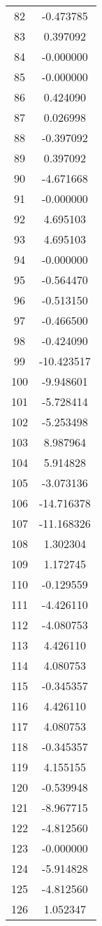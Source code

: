 \documentclass[12pt]{article}
\begin{document}
\begin{longtable}{@{}cc@{}}
82 & -0.473785 \\
83 & 0.397092 \\
84 & -0.000000 \\
85 & -0.000000 \\
86 & 0.424090 \\
87 & 0.026998 \\
88 & -0.397092 \\
89 & 0.397092 \\
90 & -4.671668 \\
91 & -0.000000 \\
92 & 4.695103 \\
93 & 4.695103 \\
94 & -0.000000 \\
95 & -0.564470 \\
96 & -0.513150 \\
97 & -0.466500 \\
98 & -0.424090 \\
99 & -10.423517 \\
100 & -9.948601 \\
101 & -5.728414 \\
102 & -5.253498 \\
103 & 8.987964 \\
104 & 5.914828 \\
105 & -3.073136 \\
106 & -14.716378 \\
107 & -11.168326 \\
108 & 1.302304 \\
109 & 1.172745 \\
110 & -0.129559 \\
111 & -4.426110 \\
112 & -4.080753 \\
113 & 4.426110 \\
114 & 4.080753 \\
115 & -0.345357 \\
116 & 4.426110 \\
117 & 4.080753 \\
118 & -0.345357 \\
119 & 4.155155 \\
120 & -0.539948 \\
121 & -8.967715 \\
122 & -4.812560 \\
123 & -0.000000 \\
124 & -5.914828 \\
125 & -4.812560 \\
126 & 1.052347 \\

\end{longtable}
\end{document}
